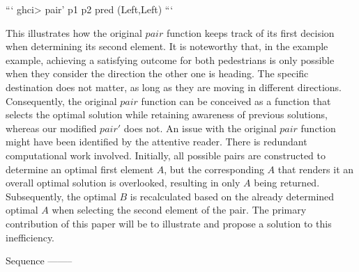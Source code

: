```
ghci> pair' p1 p2 pred
(Left,Left)
```

This illustrates how the original $pair$ function keeps track of its first decision when 
determining its second element. It is noteworthy that, in the example example, achieving a 
satisfying outcome for both pedestrians is only possible when they consider the direction 
the other one is heading. The specific destination does not matter, as long as they are 
moving in different directions. Consequently, the original $pair$ function can be 
conceived as a function that selects the optimal solution while retaining awareness of 
previous solutions, whereas our modified $pair'$ does not.
An issue with the original $pair$ function might have been identified by the attentive 
reader. There is redundant computational work involved. Initially, all possible pairs 
are constructed to determine an optimal first element $A$, but the corresponding $A$ 
that renders it an overall optimal solution is overlooked, resulting in only $A$ being 
returned. Subsequently, the optimal $B$ is recalculated based on the already determined 
optimal $A$ when selecting the second element of the pair.
The primary contribution of this paper will be to illustrate and propose a solution to 
this inefficiency.

Sequence
--------

